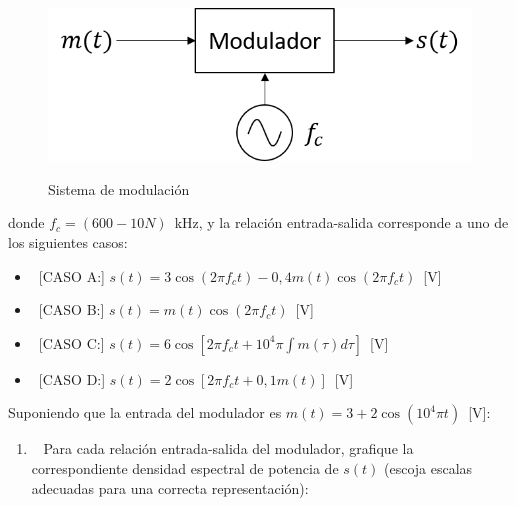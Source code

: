 \begin{enumerate}
\begin{figure}[h!]
	\captionsetup{justification = raggedright, singlelinecheck = false}
	\caption{Sistema de modulación} 
	\centering
	\includegraphics[scale=0.38]{Imagenes/Modulador.png}
	\label{fig:Modulador}
\end{figure}
donde $f_c=(600-10N)$~kHz, y la relación entrada-salida corresponde a uno de los siguientes casos:
\begin{itemize}
	\item~[CASO A:] $s(t)=3\cos(2\pi f_c t)-0,4m(t)\cos(2\pi f_c t)$~[V]
	\item~[CASO B:] $s(t)=m(t)\cos(2\pi f_c t)$~[V]
	\item~[CASO C:]  $s(t)=6\cos[2\pi f_c t+10^4\pi\int{m(\tau)d\tau}]$~[V]
	\item~[CASO D:] $s(t)=2\cos[2\pi f_c t+0,1m(t)]$~[V]
\end{itemize}
Suponiendo que la entrada del modulador es $m(t)=3+2\cos(10^4\pi t)$~[V]:
\begin{enumerate}
	\item~ Para cada relación entrada-salida del modulador, grafique la correspondiente densidad espectral de potencia de $s(t)$ (escoja escalas adecuadas para una correcta representación):

				

\end{enumerate}
\end{enumerate}
